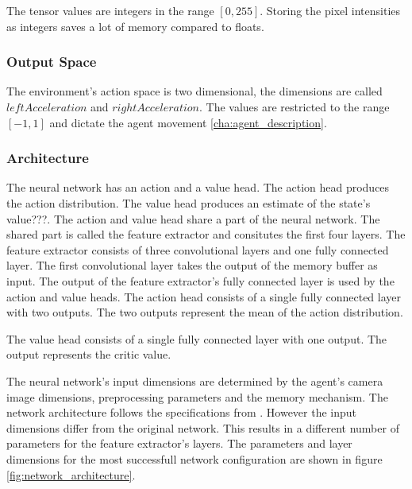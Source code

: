 The tensor values are integers in the range $[0,255]$. Storing the pixel intensities as integers saves a lot of memory compared to floats.


\subsubsection*{Output Space}

The environment's action space is two dimensional, the dimensions are called $leftAcceleration$ and $rightAcceleration$. The values are restricted to the range $[-1,1]$ and dictate the agent movement \ref*{cha:agent_description}.

\subsubsection{Architecture}

The neural network has an action and a value head. The action head produces the action distribution. The value head produces an estimate of the state's value???. The action and value head share a part of the neural network. The shared part is called the feature extractor and consitutes the first four layers. The feature extractor consists of three convolutional layers and one fully connected layer. The first convolutional layer takes the output of the memory buffer as input. The output of the feature extractor's fully connected layer is used by the action and value heads.
The action head consists of a single fully connected layer with two outputs. The two outputs represent the mean of the action distribution.

The value head consists of a single fully connected layer with one output. The output represents the critic value.

The neural network's input dimensions are determined by the agent's camera image dimensions, preprocessing parameters and the memory mechanism. The network architecture follows the specifications from \autocite{nature}. However the input dimensions differ from the original network. This results in a different number of parameters for the feature extractor's layers.
The parameters and layer dimensions for the most successfull network configuration are shown in figure \ref{fig:network_architecture}.




